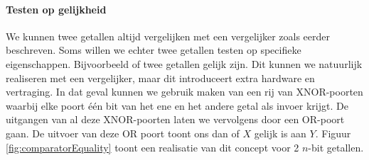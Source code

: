 \paragraph{Testen op gelijkheid}
We kunnen twee getallen altijd vergelijken met een vergelijker zoals eerder beschreven. Soms willen we echter twee getallen testen op specifieke eigenschappen. Bijvoorbeeld of twee getallen gelijk zijn. Dit kunnen we natuurlijk realiseren met een vergelijker, maar dit introduceert extra hardware en vertraging. In dat geval kunnen we gebruik maken van een rij van XNOR-poorten waarbij elke poort \'e\'en bit van het ene en het andere getal als invoer krijgt. De uitgangen van al deze XNOR-poorten laten we vervolgens door een OR-poort gaan. De uitvoer van deze OR poort toont ons dan of $X$ gelijk is aan $Y$. Figuur \ref{fig:comparatorEquality} toont een realisatie van dit concept voor 2 $n$-bit getallen.
